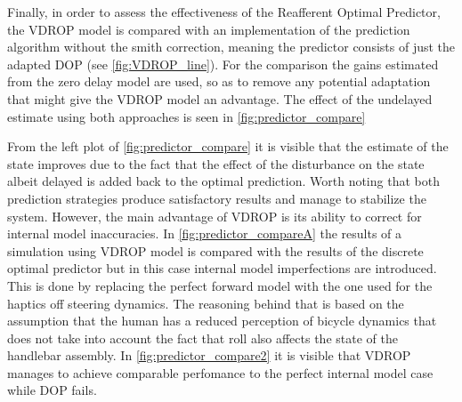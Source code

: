 Finally, in order to assess the effectiveness of the Reafferent Optimal Predictor, the VDROP model is compared with an implementation of the prediction algorithm without the smith correction, meaning the predictor consists of just the adapted DOP (see \cref{fig:VDROP_line}). For the comparison the gains estimated from the zero delay model are used, so as to remove any potential adaptation that might give the VDROP model an advantage. The effect of the undelayed estimate using both approaches is seen in \cref{fig:predictor_compare}


From the left plot of \cref{fig:predictor_compare} it is visible that the estimate of the state  improves due to the fact that the effect of the disturbance on the state albeit delayed is added back to the optimal prediction. Worth noting that both prediction strategies produce satisfactory results and manage to stabilize the system. However, the main advantage of  VDROP is its ability to correct for internal model inaccuracies. In \cref{fig:predictor_compareA} the results of a simulation using VDROP  model is compared with the results of the discrete optimal predictor but in this case internal model imperfections are introduced. This is done by replacing the perfect forward model with  the one used for the haptics off steering dynamics. The reasoning behind that is based on the assumption that the human has a reduced perception of bicycle dynamics that does not take into account the fact that roll also affects the state of the handlebar assembly.  In \cref{fig:predictor_compare2} it is visible that VDROP manages to achieve comparable perfomance to the perfect internal model case while DOP fails. 

